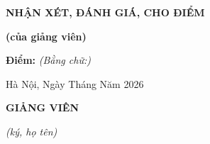 \clearpage
\thispagestyle{empty}

\begin{center}
\vspace*{0.8cm}
{\bfseries NHẬN XÉT, ĐÁNH GIÁ, CHO ĐIỂM\par}
\vspace{0.25cm}
{\bfseries (của giảng viên)\par}
\end{center}

\vspace{0.5cm}

\noindent\makebox[\textwidth]{\dotfill}\par\vspace{0.35cm}
\noindent\makebox[\textwidth]{\dotfill}\par\vspace{0.35cm}
\noindent\makebox[\textwidth]{\dotfill}\par\vspace{0.35cm}
\noindent\makebox[\textwidth]{\dotfill}\par\vspace{0.35cm}
\noindent\makebox[\textwidth]{\dotfill}\par\vspace{0.35cm}
\noindent\makebox[\textwidth]{\dotfill}\par\vspace{0.35cm}
\noindent\makebox[\textwidth]{\dotfill}\par\vspace{0.35cm}
\noindent\makebox[\textwidth]{\dotfill}\par\vspace{0.35cm}
\noindent\makebox[\textwidth]{\dotfill}\par\vspace{0.35cm}
\noindent\makebox[\textwidth]{\dotfill}\par\vspace{0.35cm}
\vspace{1cm}

\noindent
\textbf{Điểm:} \makebox[4.2cm]{\dotfill}
\textit{(Bằng chữ:}\makebox[4.5cm]{\dotfill}\textit{)}

\vspace{1cm}

\begin{flushright}
Hà Nội, Ngày \makebox[0.8cm]{\dotfill}
Tháng \makebox[0.8cm]{\dotfill}
Năm 2026

\vspace{0.2cm}

\textbf{GIẢNG VIÊN}

\vspace{0.3cm}

\textit{(ký, họ tên)}
\end{flushright}
